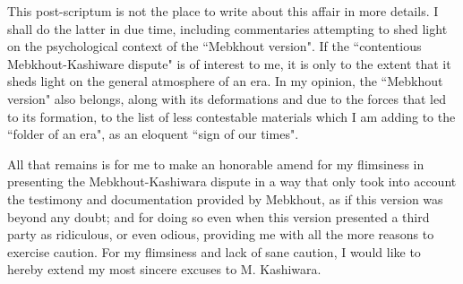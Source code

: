 This post-scriptum is not the place to write about this affair in more details. I shall do the latter in due time, including commentaries attempting to shed light on the psychological context of the ``Mebkhout version". If the ``contentious Mebkhout-Kashiware dispute" is of interest to me, it is only to the extent that it sheds light on the general atmosphere of an era. In my opinion, the ``Mebkhout version" also belongs, along with its deformations and due to the forces that led to its formation, to the list of less contestable materials which I am adding to the ``folder of an era", as an eloquent ``sign of our times".

All that remains is for me to make an honorable amend for my flimsiness in presenting the Mebkhout-Kashiwara dispute in a way that only took into account the testimony and documentation provided by Mebkhout, as if this version was beyond any doubt; and for doing so even when this version presented a third party as ridiculous, or even odious, providing me with all the more reasons to exercise caution. For my flimsiness and lack of sane caution, I would like to hereby extend my most sincere excuses to M. Kashiwara.

%

